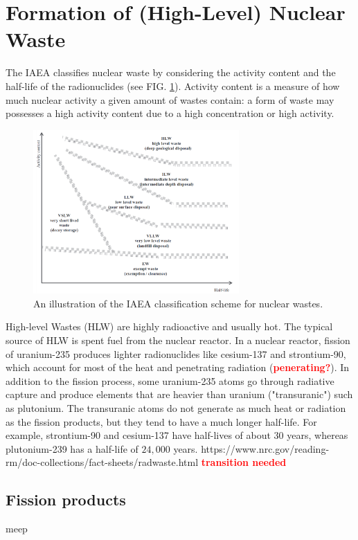 \documentclass[preprint,aip,cha]{revtex4-1}
\newcommand{\red}[1]{\textcolor{red}{\bf #1}}
\begin{document}
\section{Formation of (High-Level) Nuclear Waste}
    The IAEA classifies nuclear waste by considering the activity content and the half-life
    of the radionuclides (see FIG. \ref{fig:scheme}). Activity content is a measure of how much nuclear activity
    a given amount of wastes contain: a form of waste may possesses a high activity content due to
    a high concentration or high activity.\cite{iaea09}
    \begin{figure}[h]
        \centering
        \includegraphics[width=0.7\textwidth]{wastescheme.png}
        \caption{An illustration of the IAEA classification scheme for nuclear wastes.\cite{iaea09}}
        \label{fig:scheme}
    \end{figure}

    High-level Wastes (HLW) are highly radioactive and usually
    hot. The typical source of HLW is spent fuel from the nuclear reactor. In a nuclear reactor,
    fission of uranium-235 produces lighter radionuclides like cesium-137 and strontium-90, which
    account for most of the heat and penetrating radiation (\red{penerating?}). In addition to
    the fission process, some uranium-235 atoms go through radiative capture and produce elements that are
    heavier than uranium ("transuranic") such as plutonium. The transuranic atoms do not generate
    as much heat or radiation as the fission products, but they tend to have a much longer half-life.
    For example, strontium-90 and cesium-137 have half-lives of about $30$ years, whereas
    plutonium-239 has a half-life of $24,000$ years. https://www.nrc.gov/reading-rm/doc-collections/fact-sheets/radwaste.html
    \red{transition needed}

    \subsection{Fission products}
    meep
\end{document}
